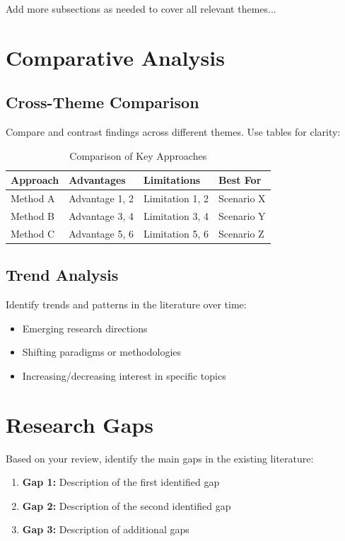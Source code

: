 \documentclass[11pt,a4paper]{article}
\begin{document}
Add more subsections as needed to cover all relevant themes...

\section{Comparative Analysis}
\label{sec:comparison}

\subsection{Cross-Theme Comparison}
Compare and contrast findings across different themes. Use tables for clarity:

\begin{table}[htbp]
\centering
\caption{Comparison of Key Approaches}
\label{tab:comparison}
\begin{tabular}{@{}llll@{}}
\toprule
\textbf{Approach} & \textbf{Advantages} & \textbf{Limitations} & \textbf{Best For} \\
\midrule
Method A & Advantage 1, 2 & Limitation 1, 2 & Scenario X \\
Method B & Advantage 3, 4 & Limitation 3, 4 & Scenario Y \\
Method C & Advantage 5, 6 & Limitation 5, 6 & Scenario Z \\
\bottomrule
\end{tabular}
\end{table}

\subsection{Trend Analysis}
Identify trends and patterns in the literature over time:
\begin{itemize}
    \item Emerging research directions
    \item Shifting paradigms or methodologies
    \item Increasing/decreasing interest in specific topics
\end{itemize}

\section{Research Gaps}
\label{sec:gaps}

Based on your review, identify the main gaps in the existing literature:

\begin{enumerate}
    \item \textbf{Gap 1:} Description of the first identified gap
    \item \textbf{Gap 2:} Description of the second identified gap
    \item \textbf{Gap 3:} Description of additional gaps
\end{enumerate}
\end{document}
